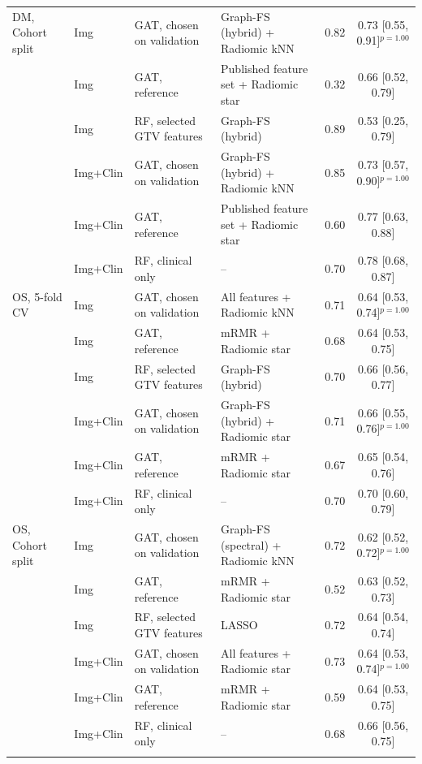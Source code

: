 \begin{tabular}{@{}llllcc@{}}
\addlinespace
DM, Cohort split & Img & GAT, chosen on validation & Graph-FS (hybrid) + Radiomic kNN & 0.82 & 0.73 [0.55, 0.91]$^{p=1.00}$ \\
 & Img & GAT, reference & Published feature set + Radiomic star & 0.32 & 0.66 [0.52, 0.79] \\
 & Img & RF, selected GTV features & Graph-FS (hybrid) & 0.89 & 0.53 [0.25, 0.79] \\
 & Img+Clin & GAT, chosen on validation & Graph-FS (hybrid) + Radiomic kNN & 0.85 & 0.73 [0.57, 0.90]$^{p=1.00}$ \\
 & Img+Clin & GAT, reference & Published feature set + Radiomic star & 0.60 & 0.77 [0.63, 0.88] \\
 & Img+Clin & RF, clinical only & -- & 0.70 & 0.78 [0.68, 0.87] \\
\midrule
OS, 5-fold CV & Img & GAT, chosen on validation & All features + Radiomic kNN & 0.71 & 0.64 [0.53, 0.74]$^{p=1.00}$ \\
 & Img & GAT, reference & mRMR + Radiomic star & 0.68 & 0.64 [0.53, 0.75] \\
 & Img & RF, selected GTV features & Graph-FS (hybrid) & 0.70 & 0.66 [0.56, 0.77] \\
 & Img+Clin & GAT, chosen on validation & Graph-FS (hybrid) + Radiomic star & 0.71 & 0.66 [0.55, 0.76]$^{p=1.00}$ \\
 & Img+Clin & GAT, reference & mRMR + Radiomic star & 0.67 & 0.65 [0.54, 0.76] \\
 & Img+Clin & RF, clinical only & -- & 0.70 & 0.70 [0.60, 0.79] \\
\addlinespace
OS, Cohort split & Img & GAT, chosen on validation & Graph-FS (spectral) + Radiomic kNN & 0.72 & 0.62 [0.52, 0.72]$^{p=1.00}$ \\
 & Img & GAT, reference & mRMR + Radiomic star & 0.52 & 0.63 [0.52, 0.73] \\
 & Img & RF, selected GTV features & LASSO & 0.72 & 0.64 [0.54, 0.74] \\
 & Img+Clin & GAT, chosen on validation & All features + Radiomic star & 0.73 & 0.64 [0.53, 0.74]$^{p=1.00}$ \\
 & Img+Clin & GAT, reference & mRMR + Radiomic star & 0.59 & 0.64 [0.53, 0.75] \\
 & Img+Clin & RF, clinical only & -- & 0.68 & 0.66 [0.56, 0.75] \\
\botrule
\end{tabular}
